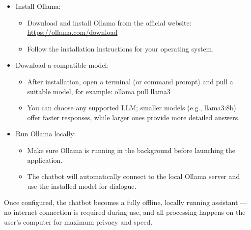 \begin{itemize}
    \item Install Ollama:
    \begin{itemize}
        \item Download and install Ollama from the official website: \href{https://ollama.com/download}{https://ollama.com/download}
        \item Follow the installation instructions for your operating system.
    \end{itemize}
    \item Download a compatible model:
    \begin{itemize}
        \item After installation, open a terminal (or command prompt) and pull a suitable model, for example: ollama pull llama3
        \item You can choose any supported LLM; smaller models (e.g., llama3:8b) offer faster responses, while larger ones provide more detailed answers.
    \end{itemize}
    \item Run Ollama locally:
    \begin{itemize}
        \item Make sure Ollama is running in the background before launching the application.
        \item The chatbot will automatically connect to the local Ollama server and use the installed model for dialogue.
    \end{itemize}
\end{itemize}

Once configured, the chatbot becomes a fully offline, locally running assistant — no internet connection is required during use, and all processing happens on the user’s computer for maximum privacy and speed.